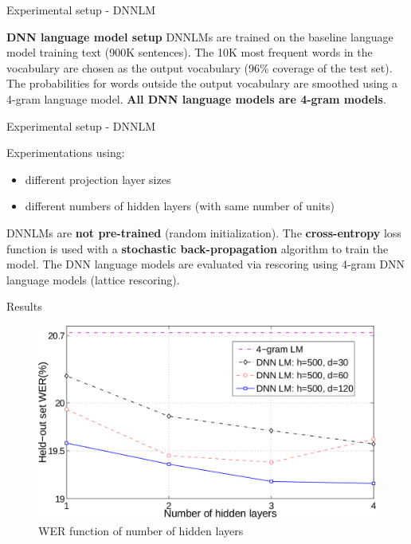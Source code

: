 \documentclass{beamer}
\begin{document}
\begin{frame}{Experimental setup - \small{DNNLM}}

\textbf{DNN language model setup}
\newline
\newline
DNNLMs are trained on the baseline language model training text (900K sentences).
\newline
\newline
The 10K most frequent words in the vocabulary are chosen as the output vocabulary ($96\%$ coverage of the test set).
\newline
\newline
The probabilities for words outside the output vocabulary are smoothed using a 4-gram language model.
\newline
\newline
\textbf{All DNN language models are 4-gram models}.
\end{frame}

\begin{frame}{Experimental setup - \small{DNNLM}}

Experimentations using:
\begin{itemize}
	\item different projection layer sizes
	\item different numbers of hidden layers (with same number of units)
\end{itemize}

\bigskip
DNNLMs are \textbf{not pre-trained} (random initialization).
\newline
\newline
The \textbf{cross-entropy} loss function is used with a \textbf{stochastic back-propagation} algorithm to train the model.
\newline
\newline
The DNN language models are evaluated via rescoring using 4-gram DNN language models (lattice rescoring).

\end{frame}

\begin{frame}{Results}
	\begin{figure}[!htb]
		\centering
	    \includegraphics[width=0.8\linewidth]{./images/results1.png}
	    \caption{WER function of number of hidden layers}
	\end{figure}
\end{frame}
\end{document}
